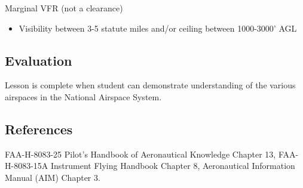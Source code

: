 Marginal VFR (not a clearance)
\begin{itemize}
  \item Visibility between 3-5 statute miles and/or ceiling between 1000-3000' AGL
\end{itemize}

\subsection{Evaluation}

Lesson is complete when student can demonstrate understanding of the various
airspaces in the National Airspace System.

\subsection{References}

FAA-H-8083-25 Pilot's Handbook of Aeronautical Knowledge Chapter 13,
FAA-H-8083-15A Instrument Flying Handbook Chapter 8, Aeronautical Information
Manual (AIM) Chapter 3.

